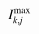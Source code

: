 

    \[\let\par\empty

    
{{{{\miitalic{I}}}\sb{{{\miitalic{k}}{\miitalic{,}}{\miitalic{j}}}}\sp{{\minormal{max}}}}}


    \]

  